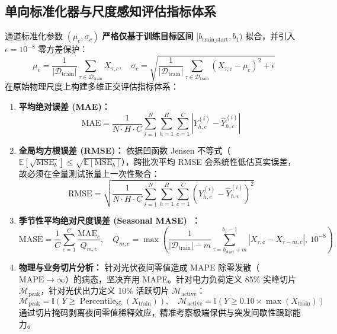 \documentclass[11pt,a4paper,UTF8]{ctexart}
\begin{document}
\subsection{单向标准化器与尺度感知评估指标体系}
通道标准化参数 $(\mu_c, \sigma_c)$ \textbf{严格仅基于训练目标区间} $[b_{\text{train\_start}}, b_1)$ 拟合，并引入 $\epsilon=10^{-8}$ 零方差保护：
\begin{equation}
    \mu_c = \frac{1}{|\mathcal{D}_{\text{train}}|} \sum_{\tau \in \mathcal{D}_{\text{train}}} X_{\tau, c}, \quad \sigma_c = \sqrt{\frac{1}{|\mathcal{D}_{\text{train}}|} \sum_{\tau \in \mathcal{D}_{\text{train}}} (X_{\tau, c} - \mu_c)^2 + \epsilon}
\end{equation}
在原始物理尺度上构建多维正交评估指标体系：
\begin{enumerate}
    \item \textbf{平均绝对误差 (MAE)：}
    \begin{equation}
        \text{MAE} = \frac{1}{N \cdot H \cdot C} \sum_{i=1}^N \sum_{h=1}^H \sum_{c=1}^C \left| Y^{(i)}_{h, c} - \hat{Y}^{(i)}_{h, c} \right|
    \end{equation}
    \item \textbf{全局均方根误差 (RMSE)：} 依据凹函数 Jensen 不等式（$\mathbb{E}[\sqrt{\text{MSE}_b}] \le \sqrt{\mathbb{E}[\text{MSE}_b]}$），跨批次平均 RMSE 会系统性低估真实误差，故必须在全量测试张量上一次性聚合：
    \begin{equation}
        \text{RMSE} = \sqrt{\frac{1}{N \cdot H \cdot C} \sum_{i=1}^N \sum_{h=1}^H \sum_{c=1}^C \left( Y^{(i)}_{h, c} - \hat{Y}^{(i)}_{h, c} \right)^2 }
    \end{equation}
    \item \textbf{季节性平均绝对尺度误差 (Seasonal MASE)~\cite{hyndman2006another}：}
    \begin{equation}
        \text{MASE} = \frac{1}{C} \sum_{c=1}^C \frac{\text{MAE}_c}{Q_{m, c}}, \quad Q_{m, c} = \max\left( \frac{1}{|\mathcal{D}_{\text{train}}| - m} \sum_{\tau=b_{\text{start}}+m}^{b_1-1} \left| X_{\tau, c} - X_{\tau-m, c} \right|, \, 10^{-8} \right)
    \end{equation}
    \item \textbf{物理与业务切片分析：} 针对光伏夜间零值造成 MAPE 除零发散（$\text{MAPE} \to \infty$）的病态，坚决弃用 MAPE。针对电力负荷定义 85\% 尖峰切片 $\mathcal{M}_{\text{peak}}$，针对光伏出力定义 10\% 活跃切片 $\mathcal{M}_{\text{active}}$：
    \begin{equation}
        \mathcal{M}_{\text{peak}} = \mathbb{I}(Y \ge \operatorname{Percentile}_{85}(X_{\text{train}})), \quad \mathcal{M}_{\text{active}} = \mathbb{I}(Y \ge 0.10 \times \max(X_{\text{train}}))
    \end{equation}
    通过切片掩码剥离夜间零值稀释效应，精准考察极端保供与突发间歇性跟踪能力。
\end{enumerate}
\end{document}
